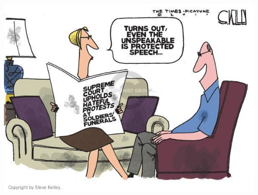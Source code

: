 \documentclass[aspectratio=169]{beamer}
\theoremstyle{principle}
\begin{document}
\begin{frame}
\begin{columns}
\begin{column}{0.5\textwidth}
\begin{center}
\includegraphics[scale=0.2]{WBC_synder.jpg}
\end{center}
\end{column}
\end{columns}
\end{frame}
\end{document}

